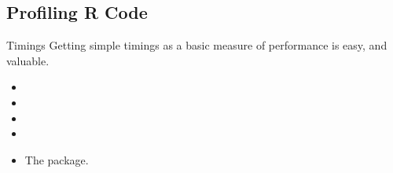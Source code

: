 \subsection{Profiling R Code}
\makesubcontentsslidessec


\begin{frame}
  \begin{block}{Timings}
  Getting simple timings as a basic measure of performance is easy, and 
valuable.
  \begin{itemize}
    \item {}
    \item {}
    \item {}
    \item {}
    \item The  package.
  \end{itemize}
  \end{block}
\end{frame}


% 
